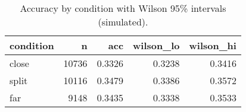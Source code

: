 \begin{table}[!ht]
\centering
\begin{table}
\caption{Accuracy by condition with Wilson 95\% intervals (simulated).}
\label{tab:fig07}
\begin{tabular}{lrrrr}
\toprule
condition & n & acc & wilson\_lo & wilson\_hi \\
\midrule
close & 10736 & 0.3326 & 0.3238 & 0.3416 \\
split & 10116 & 0.3479 & 0.3386 & 0.3572 \\
far & 9148 & 0.3435 & 0.3338 & 0.3533 \\
\bottomrule
\end{tabular}
\end{table}
\end{table}

